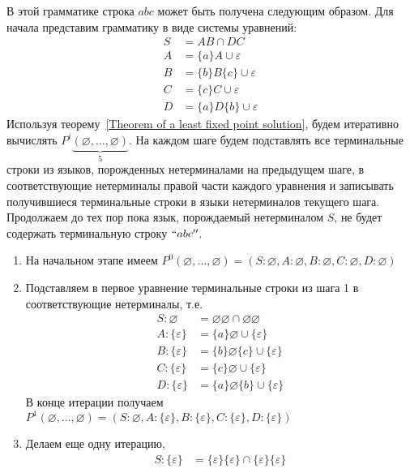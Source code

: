 \begin{example}
	В этой грамматике строка $abc$ может быть получена следующим образом. Для начала представим грамматику в виде системы уравнений:
	\begin{align*}
	S &= A B \cap D C \\ 
	A &= \{a\}A \cup \varepsilon \\ 
	B &= \{b\}B\{c\} \cup \varepsilon \\
	C &= \{c\}C \cup \varepsilon \\ 
	D &= \{a\}D\{b\} \cup \varepsilon
	\end{align*}
	Используя теорему~\ref{Theorem of a least fixed point solution}, будем итеративно вычислять $P^{i}\underbrace{(\varnothing,\ldots,\varnothing)}_5$. На каждом шаге будем подставлять все терминальные строки из языков, порожденных нетерминалами на предыдущем шаге, в соответствующие нетерминалы правой части каждого уравнения и записывать получившиеся терминальные строки в языки нетерминалов текущего шага. Продолжаем до тех пор пока язык, порождаемый нетерминалом $S$, не будет содержать терминальную строку $``abc''$.
	\begin{enumerate}
        \item На начальном этапе имеем $P^{0}(\varnothing,\ldots,\varnothing) = (S: \varnothing, A: \varnothing, B: \varnothing, C: \varnothing, D: \varnothing)$ 
        \item Подставляем в первое уравнение терминальные строки из шага 1 в соответствующие нетерминалы, т.е. 
        \begin{align*}
        	S:  \varnothing &= \varnothing\varnothing \cap \varnothing\varnothing \\ 
        	A: \{\varepsilon\} &= \{a\}\varnothing \cup \{\varepsilon\} \\ 
        	B: \{\varepsilon\} &= \{b\}\varnothing\{c\} \cup \{\varepsilon\} \\
        	C: \{\varepsilon\} &= \{c\}\varnothing \cup \{\varepsilon\} \\ 
        	D: \{\varepsilon\} &= \{a\}\varnothing\{b\} \cup \{\varepsilon\}
    	\end{align*}
    	В конце итерации получаем $P^{1}(\varnothing,\ldots,\varnothing) = (S: \varnothing, A: \{\varepsilon\}, B: \{\varepsilon\}, C: \{\varepsilon\}, D: \{\varepsilon\})$
    	\item Делаем еще одну итерацию,
    	\begin{align*}
        	S:  \{\varepsilon\} &= \{\varepsilon\}\{\varepsilon\} \cap \{\varepsilon\}\{\varepsilon\} \\ 

\end{align*}
\end{enumerate}
\end{example}

